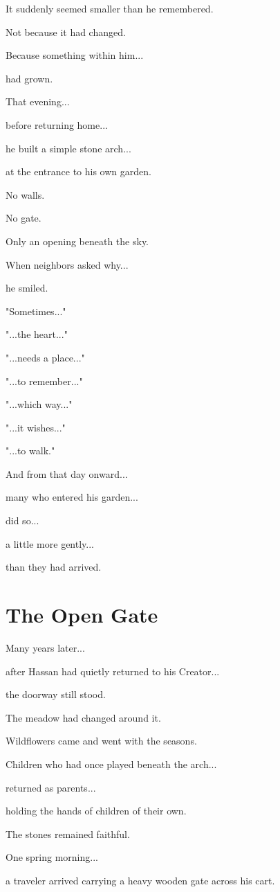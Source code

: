 \documentclass[12pt,openany]{book}
\begin{document}
It suddenly seemed smaller than he remembered.

Not because it had changed.

Because something within him...

had grown.

That evening...

before returning home...

he built a simple stone arch...

at the entrance to his own garden.

No walls.

No gate.

Only an opening beneath the sky.

When neighbors asked why...

he smiled.

"Sometimes..."

"...the heart..."

"...needs a place..."

"...to remember..."

"...which way..."

"...it wishes..."

"...to walk."

And from that day onward...

many who entered his garden...

did so...

a little more gently...

than they had arrived.
\section*{The Open Gate}

Many years later...

after Hassan had quietly returned to his Creator...

the doorway still stood.

The meadow had changed around it.

Wildflowers came and went with the seasons.

Children who had once played beneath the arch...

returned as parents...

holding the hands of children of their own.

The stones remained faithful.

One spring morning...

a traveler arrived carrying a heavy wooden gate across his cart.
\end{document}
